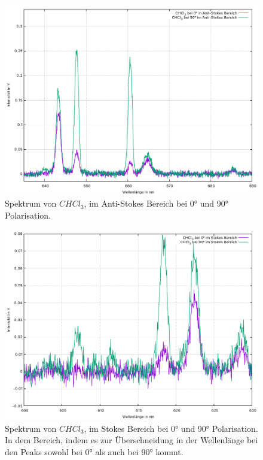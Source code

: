 \begin{figure}[h]
  \centering
  \includegraphics[scale=0.5]{Bilder/Verbesserung_Auswertung/chcl3_anti.pdf}
  \caption{Spektrum von $CHCl_3$, im Anti-Stokes Bereich bei 0° und 90° Polarisation.}
\end{figure}
\begin{figure}[h]
  \centering
  \includegraphics[scale=0.5]{Bilder/Verbesserung_Auswertung/chcl3_stokes.pdf}
  \caption{Spektrum von $CHCl_3$, im Stokes Bereich bei 0° und 90° Polarisation. In dem Bereich, indem es zur Überschneidung in der Wellenlänge bei den Peaks sowohl bei 0° als auch bei 90° kommt.}
\end{figure}

